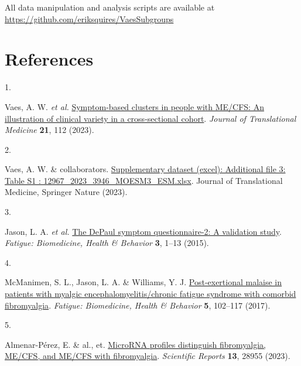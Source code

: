 \documentclass[
  letterpaper,
  DIV=11,
  numbers=noendperiod]{scrartcl}
\newlength{\cslhangindent}
\newlength{\csllabelwidth}
\newenvironment{CSLReferences}[2] %
 {\begin{list}{}{%
  \setlength{\itemindent}{0pt}
  \setlength{\leftmargin}{0pt}
  \setlength{\parsep}{0pt}
  \ifodd #1
   \setlength{\leftmargin}{\cslhangindent}
   \setlength{\itemindent}{-1\cslhangindent}
  \fi
  \setlength{\itemsep}{#2\baselineskip}}}
 {\end{list}}
\newcommand{\CSLLeftMargin}[1]{\parbox[t]{\csllabelwidth}{\strut#1\strut}}
\newcommand{\CSLRightInline}[1]{\parbox[t]{\linewidth - \csllabelwidth}{\strut#1\strut}}
\begin{document}
All data manipulation and analysis scripts are available at
\url{https://github.com/eriksquires/VaesSubgroups}

\newpage{}

\section*{References}\label{references}

\label{refs}
\begin{CSLReferences}{0}{0}
\CSLLeftMargin{1. }%
\CSLRightInline{Vaes, A. W. \emph{et al.}
\href{https://doi.org/10.1186/s12967-023-03946-6}{Symptom-based clusters
in people with ME/CFS: An illustration of clinical variety in a
cross-sectional cohort}. \emph{Journal of Translational Medicine}
\textbf{21}, 112 (2023).}

\CSLLeftMargin{2. }%
\CSLRightInline{Vaes, A. W. \& collaborators.
\href{https://static-content.springer.com/esm/art\%3A10.1186\%2Fs12967-023-03946-6/MediaObjects/12967_2023_3946_MOESM3_ESM.xlsx}{Supplementary
dataset (excel): Additional file 3: Table S1 :
12967\_2023\_3946\_MOESM3\_ESM.xlsx}. Journal of Translational Medicine,
Springer Nature (2023).}

\CSLLeftMargin{3. }%
\CSLRightInline{Jason, L. A. \emph{et al.}
\href{https://doi.org/10.1080/21641846.2014.978110}{The DePaul symptom
questionnaire-2: A validation study}. \emph{Fatigue: Biomedicine, Health
\& Behavior} \textbf{3}, 1--13 (2015).}

\CSLLeftMargin{4. }%
\CSLRightInline{McManimen, S. L., Jason, L. A. \& Williams, Y. J.
\href{https://doi.org/10.1080/21641846.2017.1281323}{Post-exertional
malaise in patients with myalgic encephalomyelitis/chronic fatigue
syndrome with comorbid fibromyalgia}. \emph{Fatigue: Biomedicine, Health
\& Behavior} \textbf{5}, 102--117 (2017).}

\CSLLeftMargin{5. }%
\CSLRightInline{Almenar-Pérez, E. \& al., et.
\href{https://doi.org/10.1038/s41598-023-28955-9}{MicroRNA profiles
distinguish fibromyalgia, ME/CFS, and ME/CFS with fibromyalgia}.
\emph{Scientific Reports} \textbf{13}, 28955 (2023).}

\end{CSLReferences}

\newpage{}
\end{document}
